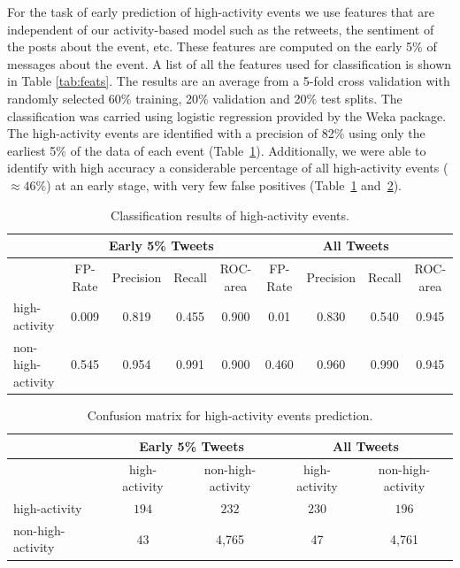 For the task of early prediction of high-activity events we use features that
are independent of our activity-based model such as the retweets, the sentiment
of the posts about the event, etc. These features are computed on the early 5\%
of messages about the event.
%
A list of all the features used for classification is shown in Table
\ref{tab:feats}.
%
The results are an average from a 5-fold cross validation with randomly selected
60\% training, 20\% validation and 20\% test splits.
%
The classification was carried using logistic regression provided by the Weka
package.
%
The high-activity events are identified with a precision of 82\% using only the
earliest 5\% of the data of each event (Table~\ref{tab:classification_results}).
%
Additionally, we were able to identify with high accuracy a considerable
percentage of all high-activity events ($\approx 46\%$) at an early stage, with
very few false positives (Table~\ref{tab:classification_results}
and~\ref{tab:confusion_matrix}).

\begin{table}
  \centering
  {\small
    \begin{tabularx}{\textwidth}{lcccc|cccc}
      \toprule
      & \multicolumn{4}{c}{\textbf{Early 5\% Tweets}} & \multicolumn{4}{c}{\textbf{All Tweets}} \\
      \midrule
      & FP-Rate & Precision & Recall & ROC-area & FP-Rate & Precision & Recall & ROC-area \\
      high-activity & 0.009 & 0.819 & 0.455 & 0.900 & 0.01 & 0.830 & 0.540 & 0.945 \\
      non-high-activity & 0.545 & 0.954 & 0.991 & 0.900 &  0.460 & 0.960 & 0.990 & 0.945 \\
      \bottomrule
    \end{tabularx}
  }
  \caption{{Classification results of high-activity events.}}
  \label{tab:classification_results}
\end{table}

\begin{table}
  \centering
  \begin{tabularx}{\textwidth}{lcc|cc}
    \toprule
    \multirow{2}{*}{ }& \multicolumn{2}{c}{\textbf{Early 5\% Tweets}} & \multicolumn{2}{c}{\textbf{All Tweets}} \\
    \midrule
    & high-activity & non-high-activity & high-activity & non-high-activity \\
    high-activity & $194$ & $232$ & $230$ & $196$\\
    non-high-activity & $43$ & 4,765 & 47 & 4,761 \\
    \bottomrule
  \end{tabularx}
  \caption{{Confusion matrix for high-activity events prediction.}}
  \label{tab:confusion_matrix}
\end{table}



